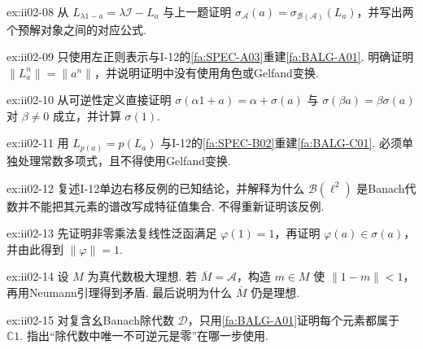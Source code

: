 \begin{FAExercise}[谱转移]{ex:ii02-08}
从 \(\displaystyle L_{\lambda1-a}=\lambda\mathcal I-L_a\) 与上一题证明 \(\displaystyle\sigma_{\mathcal A}(a)=\sigma_{\mathcal B(\mathcal A)}(L_a)\)，并写出两个预解对象之间的对应公式.
\end{FAExercise}

\begin{FAExercise}[Banach代数谱非空紧与谱半径公式]{ex:ii02-09}
只使用左正则表示与I-12的\autoref{fa:SPEC-A03}重建\autoref{fa:BALG-A01}. 明确证明 \(\displaystyle\|L_a^n\|=\|a^n\|\)，并说明证明中没有使用角色或Gelfand变换.
\end{FAExercise}

\begin{FAExercise}[谱的仿射规则]{ex:ii02-10}
从可逆性定义直接证明 \(\displaystyle\sigma(\alpha1+a)=\alpha+\sigma(a)\) 与 \(\displaystyle\sigma(\beta a)=\beta\sigma(a)\) 对 \(\displaystyle\beta\neq0\) 成立，并计算 \(\displaystyle\sigma(1)\).
\end{FAExercise}

\begin{FAExercise}[多项式谱映射]{ex:ii02-11}
用 \(\displaystyle L_{p(a)}=p(L_a)\) 与I-12的\autoref{fa:SPEC-B02}重建\autoref{fa:BALG-C01}. 必须单独处理常数多项式，且不得使用Gelfand变换.
\end{FAExercise}

\begin{FAExercise}[谱与特征值的边界]{ex:ii02-12}
复述I-12单边右移反例的已知结论，并解释为什么 \(\displaystyle\mathcal B(\ell^2)\) 是Banach代数并不能把其元素的谱改写成特征值集合. 不得重新证明该反例.
\end{FAExercise}

\begin{FAExercise}[角色的单位值与自动连续性]{ex:ii02-13}
先证明非零乘法复线性泛函满足 \(\displaystyle\varphi(1)=1\)，再证明 \(\displaystyle\varphi(a)\in\sigma(a)\)，并由此得到 \(\displaystyle\|\varphi\|=1\).
\end{FAExercise}

\begin{FAExercise}[极大理想闭性]{ex:ii02-14}
设 \(\displaystyle M\) 为真代数极大理想. 若 \(\displaystyle\overline M=\mathcal A\)，构造 \(\displaystyle m\in M\) 使 \(\displaystyle\|1-m\|<1\)，再用Neumann引理得到矛盾. 最后说明为什么 \(\displaystyle\overline M\) 仍是理想.
\end{FAExercise}

\begin{FAExercise}{ex:ii02-15}
对复含幺Banach除代数 \(\displaystyle\mathcal D\)，只用\autoref{fa:BALG-A01}证明每个元素都属于 \(\displaystyle\mathbb C1\). 指出“除代数中唯一不可逆元是零”在哪一步使用.
\end{FAExercise}

